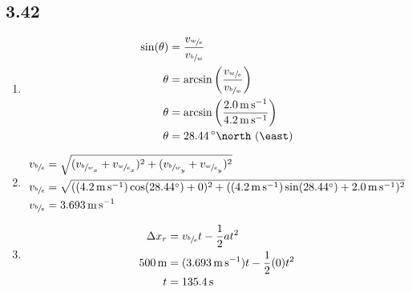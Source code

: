 \documentclass{article}
\begin{document}
\subsection{3.42}
\begin{enumerate}[label=\textbf{(\alph*)}]
	\item
		\begin{align*}
			\sin(\theta) & = \frac{ v_{\sfrac{w}{e}} }{ v_{\sfrac{b}{w}} } \\
			\theta & = \arcsin \left( \frac{ v_{\sfrac{w}{e}} }{ v_{\sfrac{b}{w}} } \right) \\
			\theta & = \arcsin \left( \frac{\SI{2.0}{\meter \per \second}}{\SI{4.2}{\meter \per \second}} \right) \\
			\theta & = \SI{28.44}{\degree \north \of \east}
		\end{align*}
	\item
		\begin{align*}
			v_{\sfrac{b}{e}} & = \sqrt{ (v_{\sfrac{b}{w}_x} + v_{\sfrac{w}{e}_x})^2 + (v_{\sfrac{b}{w}_y} + v_{\sfrac{w}{e}_y})^2 } \\
			v_{\sfrac{b}{e}} & = \sqrt{ ((\SI{4.2}{\meter \per \second})\cos(\SI{28.44}{\degree}) + 0)^2 + ((\SI{4.2}{\meter \per \second})\sin(\SI{28.44}{\degree}) + \SI{2.0}{\meter \per \second})^2 } \\
			v_{\sfrac{b}{e}} & = \SI{3.693}{\meter \per \second}
		\end{align*}
	\item
		\begin{align*}
			\Delta x_r & = v_{\sfrac{b}{e}}t - \frac{1}{2}at^2 \\
			\SI{500}{\meter} & = (\SI{3.693}{\meter \per \second})t - \frac{1}{2}(0)t^2 \\
			t & = \SI{135.4}{\second}
		\end{align*}
\end{enumerate}
\end{document}
